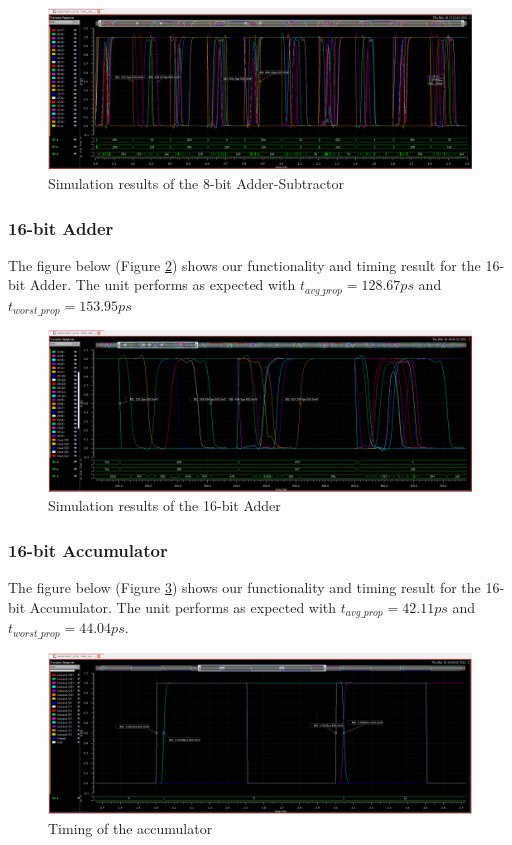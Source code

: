 \documentclass[letterpaper, 11pt]{article}
\begin{document}
	\begin{figure}[htb!]
		\centering
		\includegraphics[width=0.85\linewidth]{report_pics/addsub8b_sim.png}
		\caption{Simulation results of the 8-bit Adder-Subtractor}
		\label{fig29}
	\end{figure}
	
	\subsubsection{16-bit Adder}
	
	The figure below (Figure \ref{fig30}) shows our functionality and timing result for the 16-bit Adder. The unit performs as expected with $t_{avg\_prop} = 128.67ps$ and $t_{worst\_prop} = 153.95ps$ 
	
	\begin{figure}[htb!]
		\centering
		\includegraphics[width=0.85\linewidth]{report_pics/add16b_sim.png}
		\caption{Simulation results of the 16-bit Adder}
		\label{fig30}
	\end{figure}
	
	
	\subsubsection{16-bit Accumulator}
	
	The figure below (Figure \ref{fig31}) shows our functionality and timing result for the 16-bit Accumulator. The unit performs as expected with $t_{avg\_prop} = 42.11ps$  and $t_{worst\_prop} = 44.04ps$. 
	
	\begin{figure}[htb!]
		\centering
		\includegraphics[width=0.85\linewidth]{report_pics/accum16b_sim.png}
		\caption{Timing of the accumulator}
		\label{fig31}
	\end{figure}
	
\end{document}
